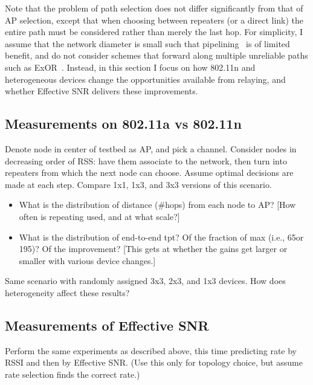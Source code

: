 Note that the problem of path selection does not differ significantly from that of AP selection, except that when choosing between repeaters (or a direct link) the entire path must be considered rather than merely the last hop. For simplicity, I assume that the network diameter is small such that pipelining~\cite{Rodrig_thesis} is of limited benefit, and do not consider schemes that forward along multiple unreliable paths such as ExOR~\cite{Biswas_ExOR}. Instead, in this section I focus on how 802.11n and heterogeneous devices change the opportunities available from relaying, and whether Effective SNR delivers these improvements.

\subsection{Measurements on 802.11a vs 802.11n}
Denote node in center of testbed as AP, and pick a channel. Consider nodes in decreasing order of RSS: have them associate to the network, then turn into repeaters from which the next node can choose. Assume optimal decisions are made at each step. Compare 1x1, 1x3, and 3x3 versions of this scenario.
\begin{itemize}
\item What is the distribution of distance (\#hops) from each node to AP? [How often is repeating used, and at what scale?]
\item What is the distribution of end-to-end tpt? Of the fraction of max (i.e., 65\Mbps or 195\Mbps)? Of the improvement? [This gets at whether the gains get larger or smaller with various device changes.]
\end{itemize}
Same scenario with randomly assigned 3x3, 2x3, and 1x3 devices. How does heterogeneity affect these results?

\subsection{Measurements of Effective SNR}
Perform the same experiments as described above, this time predicting rate by RSSI and then by Effective SNR\@. (Use this only for topology choice, but assume rate selection finds the correct rate.)